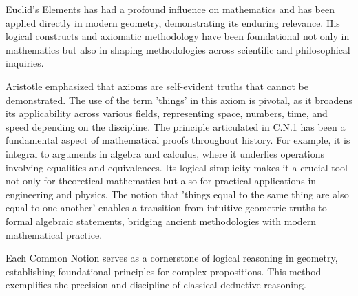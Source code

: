 \begin{figure}[H]
\centering
{}
\end{figure}

Euclid's Elements has had a profound influence on mathematics and has been applied directly in modern geometry, demonstrating its enduring relevance. His logical constructs and axiomatic methodology have been foundational not only in mathematics but also in shaping methodologies across scientific and philosophical inquiries.

Aristotle emphasized that axioms are self-evident truths that cannot be demonstrated. The use of the term 'things' in this axiom is pivotal, as it broadens its applicability across various fields, representing space, numbers, time, and speed depending on the discipline. The principle articulated in C.N.1 has been a fundamental aspect of mathematical proofs throughout history. For example, it is integral to arguments in algebra and calculus, where it underlies operations involving equalities and equivalences. Its logical simplicity makes it a crucial tool not only for theoretical mathematics but also for practical applications in engineering and physics. The notion that 'things equal to the same thing are also equal to one another' enables a transition from intuitive geometric truths to formal algebraic statements, bridging ancient methodologies with modern mathematical practice.

Each Common Notion serves as a cornerstone of logical reasoning in geometry, establishing foundational principles for complex propositions. This method exemplifies the precision and discipline of classical deductive reasoning.

\clearpage